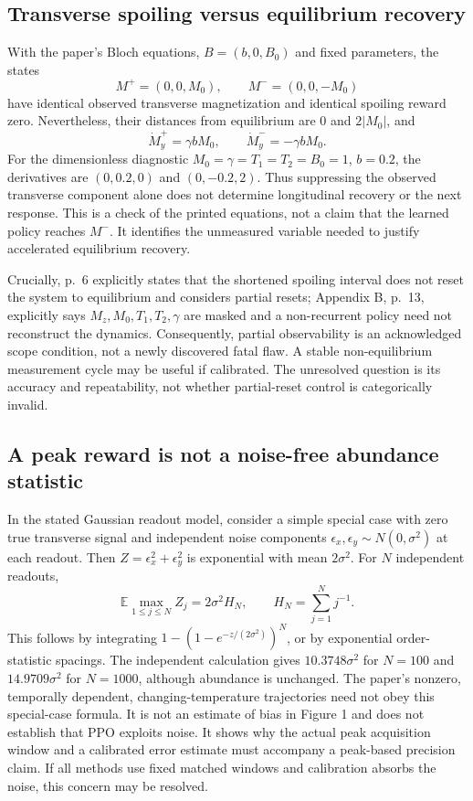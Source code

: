 \documentclass[10pt]{article}
\begin{document}
\subsection*{Transverse spoiling versus equilibrium recovery}
With the paper’s Bloch equations, \(B=(b,0,B_0)\) and fixed parameters, the states \[M^+=(0,0,M_0),\qquad M^-=(0,0,-M_0)\] have identical observed transverse magnetization and identical spoiling reward zero. Nevertheless, their distances from equilibrium are \(0\) and \(2|M_0|\), and \[\dot M_y^+=\gamma bM_0,\qquad
 \dot M_y^-=-\gamma bM_0.\] For the dimensionless diagnostic \(M_0=\gamma=T_1=T_2=B_0=1\), \(b=0.2\), the derivatives are \((0,0.2,0)\) and \((0,-0.2,2)\). Thus suppressing the observed transverse component alone does not determine longitudinal recovery or the next response. This is a check of the printed equations, not a claim that the learned policy reaches \(M^-\). It identifies the unmeasured variable needed to justify accelerated equilibrium recovery.\par
Crucially, p. 6 explicitly states that the shortened spoiling interval does not reset the system to equilibrium and considers partial resets; Appendix B, p. 13, explicitly says \(M_z,M_0,T_1,T_2,\gamma\) are masked and a non-recurrent policy need not reconstruct the dynamics. Consequently, partial observability is an acknowledged scope condition, not a newly discovered fatal flaw. A stable non-equilibrium measurement cycle may be useful if calibrated. The unresolved question is its accuracy and repeatability, not whether partial-reset control is categorically invalid.\par
\subsection*{A peak reward is not a noise-free abundance statistic}
In the stated Gaussian readout model, consider a simple special case with zero true transverse signal and independent noise components \(\epsilon_x,\epsilon_y\sim N(0,\sigma^2)\) at each readout. Then \(Z=\epsilon_x^2+\epsilon_y^2\) is exponential with mean \(2\sigma^2\). For \(N\) independent readouts, \[\mathbb E\max_{1\leq j\leq N} Z_j=2\sigma^2 H_N,
 \qquad H_N=\sum_{j=1}^N j^{-1}.\] This follows by integrating \(1-(1-e^{-z/(2\sigma^2)})^N\), or by exponential order-statistic spacings. The independent calculation gives \(10.3748\sigma^2\) for \(N=100\) and \(14.9709\sigma^2\) for \(N=1000\), although abundance is unchanged. The paper’s nonzero, temporally dependent, changing-temperature trajectories need not obey this special-case formula. It is not an estimate of bias in Figure 1 and does not establish that PPO exploits noise. It shows why the actual peak acquisition window and a calibrated error estimate must accompany a peak-based precision claim. If all methods use fixed matched windows and calibration absorbs the noise, this concern may be resolved.\par
\end{document}
